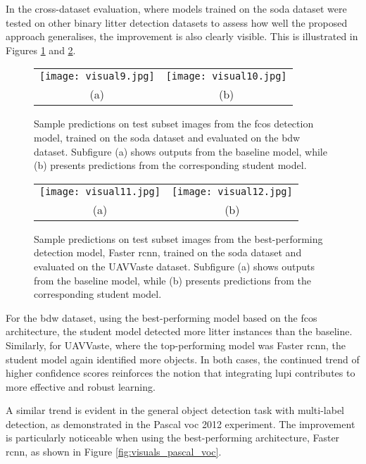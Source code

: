 In the cross-dataset evaluation, where models trained on the \gls{soda} dataset were tested on other binary litter detection datasets to assess how well the proposed approach generalises, the improvement is also clearly visible. This is illustrated in Figures \ref{fig:visuals_bdw} and \ref{fig:visuals_uavvaste}.

\begin{figure}[!ht]
  \centering
  \begin{tabular}{cc}
    \texttt{[image: visual9.jpg]} &
    \texttt{[image: visual10.jpg]} \\
    \small (a) & \small (b) \\
  \end{tabular}
  \caption{Sample predictions on test subset images from the \gls{fcos} detection model, trained on the \gls{soda} dataset and evaluated on the \gls{bdw} dataset. Subfigure (a) shows outputs from the baseline model, while (b) presents predictions from the corresponding student model.}
  \label{fig:visuals_bdw}
\end{figure}

\begin{figure}[!ht]
  \centering
  \begin{tabular}{cc}
    \texttt{[image: visual11.jpg]} &
    \texttt{[image: visual12.jpg]} \\
    \small (a) & \small (b) \\
  \end{tabular}
  \caption{Sample predictions on test subset images from the best-performing detection model, Faster \gls{rcnn}, trained on the \gls{soda} dataset and evaluated on the UAVVaste dataset. Subfigure (a) shows outputs from the baseline model, while (b) presents predictions from the corresponding student model.}
  \label{fig:visuals_uavvaste}
\end{figure}

For the \gls{bdw} dataset, using the best-performing model based on the \gls{fcos} architecture, the student model detected more litter instances than the baseline. Similarly, for UAVVaste, where the top-performing model was Faster \gls{rcnn}, the student model again identified more objects. In both cases, the continued trend of higher confidence scores reinforces the notion that integrating \gls{lupi} contributes to more effective and robust learning.

A similar trend is evident in the general object detection task with multi-label detection, as demonstrated in the Pascal \gls{voc} 2012 experiment. The improvement is particularly noticeable when using the best-performing architecture, Faster \gls{rcnn}, as shown in Figure \ref{fig:visuals_pascal_voc}.

